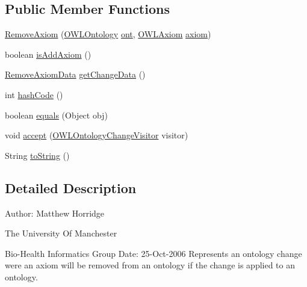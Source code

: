 \subsection*{Public Member Functions}
\begin{DoxyCompactItemize}
\item 
\hyperlink{classorg_1_1semanticweb_1_1owlapi_1_1model_1_1_remove_axiom_a347a34e0d26e97a35bd1e9534098029e}{Remove\-Axiom} (\hyperlink{interfaceorg_1_1semanticweb_1_1owlapi_1_1model_1_1_o_w_l_ontology}{O\-W\-L\-Ontology} \hyperlink{classorg_1_1semanticweb_1_1owlapi_1_1model_1_1_o_w_l_ontology_change_a9b8b64f1cab33aae500db20e19186211}{ont}, \hyperlink{interfaceorg_1_1semanticweb_1_1owlapi_1_1model_1_1_o_w_l_axiom}{O\-W\-L\-Axiom} \hyperlink{classorg_1_1semanticweb_1_1owlapi_1_1model_1_1_o_w_l_axiom_change_a83ce115af103f6cb9ce7598780a296dc}{axiom})
\item 
boolean \hyperlink{classorg_1_1semanticweb_1_1owlapi_1_1model_1_1_remove_axiom_a869ee3a0be86ab092ed91963fd5b1a77}{is\-Add\-Axiom} ()
\item 
\hyperlink{classorg_1_1semanticweb_1_1owlapi_1_1change_1_1_remove_axiom_data}{Remove\-Axiom\-Data} \hyperlink{classorg_1_1semanticweb_1_1owlapi_1_1model_1_1_remove_axiom_a9f59e3a80d7d65d4150009cb3eddae26}{get\-Change\-Data} ()
\item 
int \hyperlink{classorg_1_1semanticweb_1_1owlapi_1_1model_1_1_remove_axiom_adfcd288c2d820c6193cba8ffc0f74d54}{hash\-Code} ()
\item 
boolean \hyperlink{classorg_1_1semanticweb_1_1owlapi_1_1model_1_1_remove_axiom_afba245deb2956470ebf0d01b658871d4}{equals} (Object obj)
\item 
void \hyperlink{classorg_1_1semanticweb_1_1owlapi_1_1model_1_1_remove_axiom_a90cea2f5387de1f0a9745bc85bf01310}{accept} (\hyperlink{interfaceorg_1_1semanticweb_1_1owlapi_1_1model_1_1_o_w_l_ontology_change_visitor}{O\-W\-L\-Ontology\-Change\-Visitor} visitor)
\item 
String \hyperlink{classorg_1_1semanticweb_1_1owlapi_1_1model_1_1_remove_axiom_ad8d21939bdda7fc29e893faed164de79}{to\-String} ()
\end{DoxyCompactItemize}


\subsection{Detailed Description}
Author\-: Matthew Horridge\par
 The University Of Manchester\par
 Bio-\/\-Health Informatics Group Date\-: 25-\/\-Oct-\/2006 Represents an ontology change were an axiom will be removed from an ontology if the change is applied to an ontology. 

